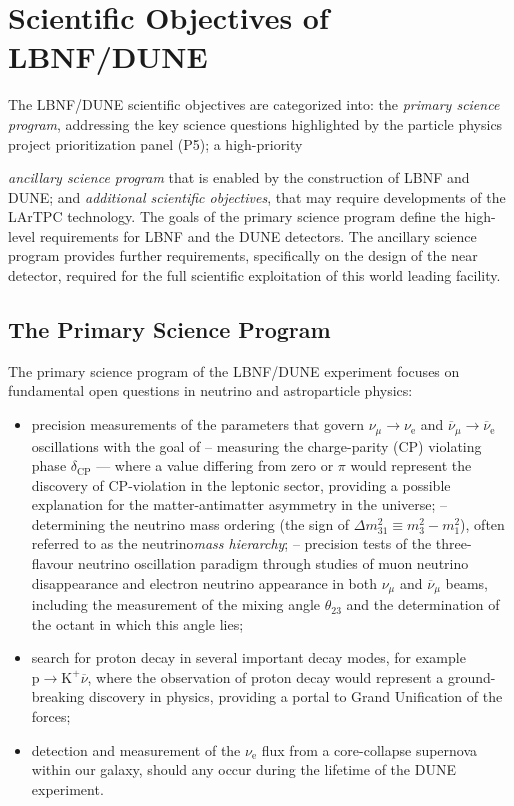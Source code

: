 \section{Scientific Objectives of LBNF/DUNE}

The LBNF/DUNE scientific objectives are categorized into: the \textit{primary science program}, addressing the key science questions highlighted by the particle physics project prioritization panel (P5); 
a high-priority {\textit{ancillary science program} that is 
enabled by the construction of LBNF and DUNE; and \textit{additional scientific objectives}, that may require developments 
of the LArTPC technology. The goals of the primary science program define the high-level requirements for LBNF and the 
DUNE detectors. The ancillary science program provides further requirements, specifically on the design of the near 
detector, required for the full scientific exploitation of this world leading facility.

\subsection{The Primary Science Program}

The primary science program of the LBNF/DUNE experiment focuses on fundamental open questions in neutrino and astroparticle physics: 
\begin{itemize}
  \item precision measurements of the parameters that govern $\nu_{\mu} \rightarrow \nu_\text{e}$ and
           $\overline{\nu}_{\mu} \rightarrow \overline{\nu}_\text{e}$ oscillations with the goal of
  \subitem -- measuring the charge-parity (CP) violating phase $\delta_\text{CP}$ --- where a value differing from zero or $\pi$ would represent the discovery of CP-violation in the leptonic sector, providing a possible explanation for the matter-antimatter asymmetry in the universe;
  \subitem -- determining the neutrino mass ordering (the sign of $\Delta m^2_{31} \equiv m_3^2-m_1^2$), often referred to as the neutrino\textit{mass hierarchy};  
  \subitem -- precision tests of the three-flavour neutrino oscillation paradigm through studies of muon neutrino disappearance 
    and electron neutrino appearance in both $\nu_\mu$ and $\overline{\nu}_{\mu}$ beams, including the 
    measurement of the mixing angle $\theta_{23}$ and the determination of the octant in which this angle lies;
    \item search for proton decay in several important decay modes, for example $\text{p}\rightarrow\text{K}^+\overline{\nu}$, where the observation of proton decay would represent a ground-breaking discovery in physics, providing a portal to Grand Unification of the forces;
    \item detection and measurement of the $\nu_\text{e}$ flux from a core-collapse supernova within our galaxy, should any occur during the lifetime of the DUNE experiment.
\end{itemize}

}

